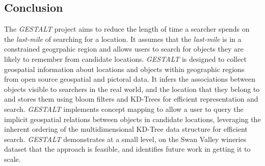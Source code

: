 \subsection{Conclusion}
The \textit{GESTALT} project aims to reduce the length of time a searcher spends on the \textit{last-mile} of searching for a location. 
It assumes that the \textit{last-mile} is in a constrained geogrpahic region and allows users to search for objects they are likely to remember from candidate locations. 
\textit{GESTALT} is designed to collect geospatial information about locations and objects within geographic regions from open source geospatial and pictoral data. 
It infers the associations between objects visible to searchers in the real world, and the location that they belong to and stores them using bloom filters and KD-Trees for efficient representation and search.
\textit{GESTALT} implements concept mapping to allow a user to query the implicit geospatial relations between objects in candidate locations, leveraging the inherent ordering of the multidimensional KD-Tree data structure for efficient search. 
\textit{GESTALT} demonstrates at a small level, on the Swan Valley wineries dataset that the approach is feasible, and identifies future work in getting it to scale.